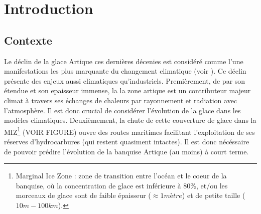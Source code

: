 
\chapter{Introduction} %

\label{Chapter1} %


\newcommand{\keyword}[1]{\textbf{#1}}
\newcommand{\tabhead}[1]{\textbf{#1}}
\newcommand{\code}[1]{\texttt{#1}}
\newcommand{\file}[1]{\texttt{\bfseries#1}}
\newcommand{\option}[1]{\texttt{\itshape#1}}









\section{Contexte}



Le déclin de la glace Artique ces dernières décenies est considéré comme l'une manifestations les plus marquante du changement climatique (voir \parencite{stroeve2012trends}). Ce déclin présente des enjeux aussi climatiques qu'industriels. Premièrement, de par son étendue et son epaisseur immense, la la zone artique est un contributeur majeur climat à travers ses échanges de chaleurs par rayonnement et radiation avec l'atmosphère. Il est donc crucial de considérer l'évolution de la glace dans les modèles climatiques. Deuxièmement, la chute de cette couverture de glace dans la MIZ\footnote{Marginal Ice Zone : zone de transition entre l’océan et le coeur de la banquise, où la concentration de
glace est inférieure à 80\%, et/ou les morceaux de glace sont de faible épaisseur ($\approx 1 mètre$) et de petite taille ($10 m - 100 km$).} (VOIR FIGURE) ouvre des routes maritimes facilitant l'exploitation de ses réserves d’hydrocarbures (qui restent quasiment intactes). Il est donc nécéssaire de pouvoir prédire l'évolution de la banquise Artique (au moins) à court terme.


